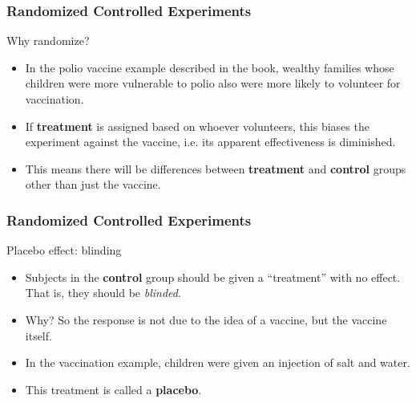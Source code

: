 \documentclass[handout]{beamer}
\begin{document}

   \begin{frame} \frametitle{Randomized Controlled Experiments}

   \begin{block}
   {Why randomize?}

   \begin{itemize}
   \item In the polio vaccine example described in the book, wealthy families whose children were more vulnerable to polio also were more likely to volunteer for vaccination.
   \item If {\bf \color{red} treatment} is assigned based on whoever volunteers, this biases the experiment against the vaccine, i.e. its apparent effectiveness is diminished.
   \item This means there will be differences between {\bf \color{red} treatment} and {\bf \color{blue} control} groups other than just the vaccine.
   \end{itemize}

   \end{block}
   \end{frame}


   \begin{frame} \frametitle{Randomized Controlled Experiments}

   \begin{block}
   {Placebo effect: blinding}
   \begin{itemize}
   \item    Subjects in the {\bf \color{blue} control} group should be given a ``treatment'' with no effect. That is, they should be {\em blinded}.
   \item Why? So the response is not due to the idea of a vaccine, but the
   vaccine itself.
   \item In the vaccination example, children were given an injection of salt and water.
   \item This treatment is called a {\bf \color{blue} placebo}.
   \end{itemize}

   \end{block}
   \end{frame}

\end{document}

